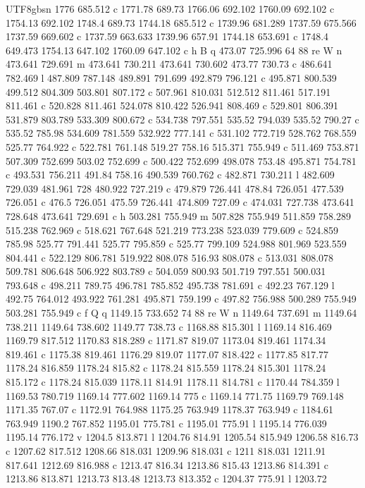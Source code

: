 \documentclass[11pt,a4paper,oneside]{report}
\begin{document}
\begin{CJK*}{UTF8}{gbsn}
{1776 685.512 c 1771.78 689.73 1766.06 692.102 1760.09 692.102 c 1754.13 692.102 1748.4 689.73 1744.18
685.512 c 1739.96 681.289 1737.59 675.566 1737.59 669.602 c 1737.59 663.633 1739.96 657.91 1744.18
653.691 c 1748.4 649.473 1754.13 647.102 1760.09 647.102 c h B q 473.07 725.996 64 88 re W n 473.641
729.691 m 473.641 730.211 473.641 730.602 473.77 730.73 c 486.641 782.469 l 487.809 787.148 489.891
791.699 492.879 796.121 c 495.871 800.539 499.512 804.309 503.801 807.172 c 507.961 810.031 512.512
811.461 517.191 811.461 c 520.828 811.461 524.078 810.422 526.941 808.469 c 529.801 806.391 531.879
803.789 533.309 800.672 c 534.738 797.551 535.52 794.039 535.52 790.27 c 535.52 785.98 534.609 781.559
532.922 777.141 c 531.102 772.719 528.762 768.559 525.77 764.922 c 522.781 761.148 519.27 758.16 515.371
755.949 c 511.469 753.871 507.309 752.699 503.02 752.699 c 500.422 752.699 498.078 753.48 495.871 754.781
c 493.531 756.211 491.84 758.16 490.539 760.762 c 482.871 730.211 l 482.609 729.039 481.961 728 480.922
727.219 c 479.879 726.441 478.84 726.051 477.539 726.051 c 476.5 726.051 475.59 726.441 474.809 727.09 c
474.031 727.738 473.641 728.648 473.641 729.691 c h 503.281 755.949 m 507.828 755.949 511.859 758.289
515.238 762.969 c 518.621 767.648 521.219 773.238 523.039 779.609 c 524.859 785.98 525.77 791.441 525.77
795.859 c 525.77 799.109 524.988 801.969 523.559 804.441 c 522.129 806.781 519.922 808.078 516.93 808.078
c 513.031 808.078 509.781 806.648 506.922 803.789 c 504.059 800.93 501.719 797.551 500.031 793.648 c
498.211 789.75 496.781 785.852 495.738 781.691 c 492.23 767.129 l 492.75 764.012 493.922 761.281 495.871
759.199 c 497.82 756.988 500.289 755.949 503.281 755.949 c f Q q 1149.15 733.652 74 88 re W n 1149.64
737.691 m 1149.64 738.211 1149.64 738.602 1149.77 738.73 c 1168.88 815.301 l 1169.14 816.469 1169.79
817.512 1170.83 818.289 c 1171.87 819.07 1173.04 819.461 1174.34 819.461 c 1175.38 819.461 1176.29 819.07
1177.07 818.422 c 1177.85 817.77 1178.24 816.859 1178.24 815.82 c 1178.24 815.559 1178.24 815.301 1178.24
815.172 c 1178.24 815.039 1178.11 814.91 1178.11 814.781 c 1170.44 784.359 l 1169.53 780.719 1169.14
777.602 1169.14 775 c 1169.14 771.75 1169.79 769.148 1171.35 767.07 c 1172.91 764.988 1175.25 763.949
1178.37 763.949 c 1184.61 763.949 1190.2 767.852 1195.01 775.781 c 1195.01 775.91 l 1195.14 776.039
1195.14 776.172 v 1204.5 813.871 l 1204.76 814.91 1205.54 815.949 1206.58 816.73 c 1207.62 817.512
1208.66 818.031 1209.96 818.031 c 1211 818.031 1211.91 817.641 1212.69 816.988 c 1213.47 816.34 1213.86
815.43 1213.86 814.391 c 1213.86 813.871 1213.73 813.48 1213.73 813.352 c 1204.37 775.91 l 1203.72
}
\end{CJK*}
\end{document}
